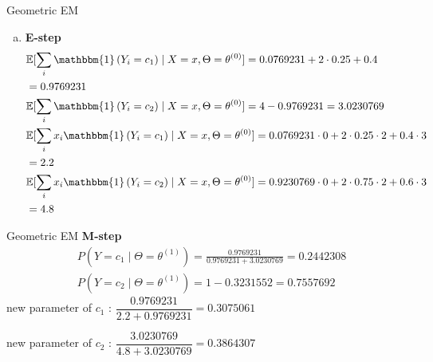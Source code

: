 \documentclass{beamer}\usepackage[]{graphicx}\usepackage[]{color}
\newcommand{\id}[1]{\mathbbm{1}\left(#1\right)}
\begin{document}
\begin{frame}{Geometric EM}
\small
\begin{enumerate}[c)]
\item \textbf{E-step}\begin{align*}
&\mathbb{E}[\sum_{i}\id{Y_{i}=c_{1}}\mid X=x, \Theta=\theta^{(0)}] = 0.0769231 + 
2\cdot 0.25 + 0.4 \\
&= 0.9769231 \\
&\mathbb{E}[\sum_{i}\id{Y_{i}=c_{2}}\mid X=x, \Theta=\theta^{(0)}] = 4 - 0.9769231 = 3.0230769 \\
&\mathbb{E}[\sum_{i}x_{i}\id{Y_{i}=c_{1}}\mid X=x, \Theta=\theta^{(0)}] = 0.0769231 \cdot 0 + 
2\cdot 0.25 \cdot 2 + 0.4 \cdot 3\\
&= 2.2 \\
&\mathbb{E}[\sum_{i}x_{i}\id{Y_{i}=c_{2}}\mid X=x, \Theta=\theta^{(0)}] = 0.9230769 \cdot 0 + 
2\cdot 0.75 \cdot 2 + 0.6 \cdot 3\\
&= 4.8
\end{align*}
\end{enumerate}
\end{frame}



\begin{frame}{Geometric EM}
\textbf{M-step}
\begin{align*}
&P(Y=c_{1}\mid \Theta = \theta^{(1)}) = \frac{0.9769231}{0.9769231 + 3.0230769} = 0.2442308 \\
&P(Y=c_{2}\mid \Theta = \theta^{(1)}) = 1 - 0.3231552
= 0.7557692 
\end{align*}
new parameter of $ c_{1} $ : $ \dfrac{0.9769231}{2.2 + 0.9769231} = 0.3075061 $\vspace{.5cm}

new parameter of $ c_{2} $ : $ \dfrac{3.0230769}{4.8 + 3.0230769} = 0.3864307 $
\end{frame}
\end{document}
